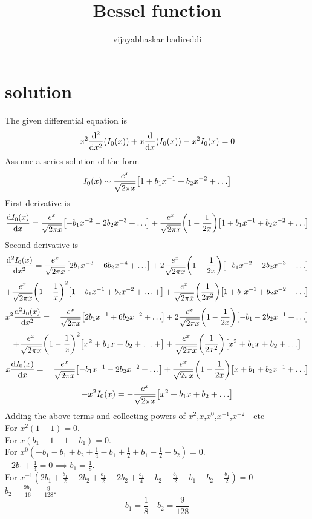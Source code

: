 \documentclass[12pt]{article}
\title{Bessel function}
\author{vijayabhaskar badireddi}
\begin{document}
\maketitle

\section*{solution}
The given differential equation is \[x^2\dv[2]{x}\qty(I_0(x))+x\dv{x}\qty(I_0(x))-x^2I_0(x)=0\]
Assume a series solution of the form \[I_0(x)\sim\frac{e^x}{\sqrt{2\pi{x}}}\bqty{1+b_1x^{-1}+b_2x^{-2}+\ldots}\]
First derivative is \[\dv{I_0(x)}{x}=\frac{e^x}{\sqrt{2\pi{x}}}\bqty{-b_1x^{-2}-2b_2x^{-3}+\ldots}+\frac{e^x}{\sqrt{2\pi{x}}}\qty(1-\frac{1}{2x})\bqty{1+b_1x^{-1}+b_2x^{-2}+\ldots}\]
Second derivative is \[\dv[2]{I_0(x)}{x}=\frac{e^x}{\sqrt{2\pi{x}}}\bqty{2b_1x^{-3}+6b_2x^{-4}+\ldots}+2\frac{e^x}{\sqrt{2\pi{x}}}\qty(1-\frac{1}{2x})\bqty{-b_1x^{-2}-2b_2x^{-3}+\ldots}\]
\[+\frac{e^x}{\sqrt{2\pi{x}}}\qty(1-\frac{1}{x})^2\bqty{1+b_1x^{-1}+b_2x^{-2}+\ldots+}+\frac{e^x}{\sqrt{2\pi{x}}}\qty(\frac{1}{2x^2})\bqty{1+b_1x^{-1}+b_2x^{-2}+\ldots}\]
\[x^2\dv[2]{I_0(x)}{x}=\quad\frac{e^x}{\sqrt{2\pi{x}}}\bqty{2b_1x^{-1}+6b_2x^{-2}+\ldots}+2\frac{e^x}{\sqrt{2\pi{x}}}\qty(1-\frac{1}{2x})\bqty{-b_1-2b_2x^{-1}+\ldots}\]
\[+\frac{e^x}{\sqrt{2\pi{x}}}\qty(1-\frac{1}{x})^2\bqty{x^2+b_1x+b_2+\ldots+}+\frac{e^x}{\sqrt{2\pi{x}}}\qty(\frac{1}{2x^2})\bqty{x^2+b_1x+b_2+\ldots}\]
\[x\dv{I_0(x)}{x}=\quad\frac{e^x}{\sqrt{2\pi{x}}}\bqty{-b_1x^{-1}-2b_2x^{-2}+\ldots}+\frac{e^x}{\sqrt{2\pi{x}}}\qty(1-\frac{1}{2x})\bqty{x+b_1+b_2x^{-1}+\ldots}\]
\[-x^2I_0(x)=-\frac{e^x}{\sqrt{2\pi{x}}}\bqty{x^2+b_1x+b_2+\ldots}\]
Adding the above terms and collecting powers of $ x^2$,$ x$,$ x^0$,$ x^{-1}$,$ x^{-2}\quad$etc\\
For $x^2(1-1)=0$.\\
For $ x(b_1-1+1-b_1)=0$.\\
For $ x^0 (-b_1-b_1+b_2+\frac{1}{4}-b_1+\frac{1}{2}+b_1-\frac{1}{2}-b_2)=0$.\\
$-2b_1+\frac{1}{4}=0\implies b_1=\frac{1}{8}$.\\
For $x^{-1}(2b_1+\frac{b_1}{2}-2b_2+\frac{b_1}{2}-2b_2+\frac{b_1}{4}-b_2+\frac{b_1}{2}-b_1+b_2-\frac{b_1}{2})=0$\\
$b_2=\frac{9b_1}{16}=\frac{9}{128}$.
\[\boxed{b_1=\frac{1}{8}\quad b_2=\frac{9}{128}}\]
\end{document}
